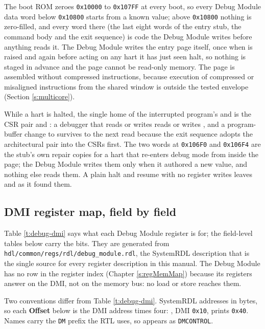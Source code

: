 The boot ROM zeroes \texttt{0x10000} to \texttt{0x107FF} at every boot, so every Debug Module data word below \texttt{0x10800} starts from a known value; above \texttt{0x10800} nothing is zero-filled, and every word there (the last eight words of the entry stub, the command body and the exit sequence) is code the Debug Module writes before anything reads it. The Debug Module writes the entry page itself, once when  is raised and again before acting on any hart it has just seen halt, so nothing is staged in advance and the page cannot be read-only memory. The page is assembled without compressed instructions, because execution of compressed or misaligned instructions from the shared window is outside the tested envelope (Section \ref{s:multicore}).

While a hart is halted, the single home of the interrupted program's  and  is the CSR pair  and : a debugger that reads or writes  reads or writes , and a program-buffer change to  survives to the next read because the exit sequence adopts the architectural pair into the CSRs first. The two words at \texttt{0x106F0} and \texttt{0x106F4} are the stub's own repair copies for a hart that re-enters debug mode from inside the page; the Debug Module writes them only when it authored a new value, and nothing else reads them. A plain halt and resume with no register writes leaves  and  as it found them.

\subsection{DMI register map, field by field} \label{ss:debug-dmi-fields}

Table \ref{t:debug-dmi} says what each Debug Module register is for; the field-level tables below carry the bits. They are generated from \texttt{hdl/common/regs/rdl/debug\_module.rdl}, the SystemRDL description that is the single source for every register description in this manual. The Debug Module has no row in the register index (Chapter \ref{s:regMemMap}) because its registers answer on the DMI, not on the memory bus: no load or store reaches them.

Two conventions differ from Table \ref{t:debug-dmi}. SystemRDL addresses in bytes, so each \textbf{Offset} below is the DMI address times four: , DMI \texttt{0x10}, prints \texttt{0x40}. Names carry the \texttt{DM} prefix the RTL uses, so  appears as \texttt{DMCONTROL}.

